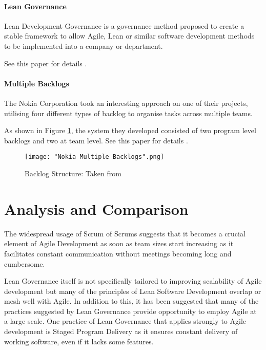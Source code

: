 \documentclass{scrartcl}
\begin{document}
\paragraph{Lean Governance}\mbox{}\newline

Lean Development Governance is a governance method proposed to create a stable framework to allow Agile, Lean or similar software development methods to be implemented into a company or department.

See this paper for details \cite{ambler2009applying}.

\paragraph{Multiple Backlogs}\mbox{}\newline

The Nokia Corporation took an interesting approach on one of their projects, utilising four different types of backlog to organise tasks across multiple teams.

As shown in Figure \ref{fig:backlogs}, the system they developed consisted of two program level backlogs and two at team level. See this paper for details \cite{laanti2008implementing}.
	
\begin{figure}
	\texttt{[image: "Nokia Multiple Backlogs".png]}
	\caption{Backlog Structure: Taken from \cite[p. ~1384]{laanti2008implementing}}
	\label{fig:backlogs}
\end{figure}


\section{Analysis and Comparison}

The widespread usage of Scrum of Scrums suggests that it becomes a crucial element of Agile Development as soon as team sizes start increasing as it facilitates constant communication without meetings becoming long and cumbersome.

Lean Governance itself is not specifically tailored to improving scalability of Agile development but many of the principles of Lean Software Development overlap or mesh well with Agile. In addition to this, it has been suggested that many of the practices suggested by Lean Governance provide opportunity to employ Agile at a large scale. \cite{ambler2009scaling} One practice of Lean Governance that applies strongly to Agile development is Staged Program Delivery as it ensures constant delivery of working software, even if it lacks some features. 
\end{document}
